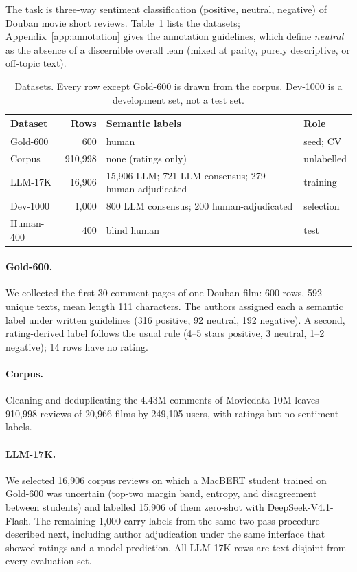 The task is three-way sentiment classification (positive, neutral,
negative) of Douban movie short reviews. Table~\ref{tab:datasets}
lists the datasets; Appendix~\ref{app:annotation} gives the annotation
guidelines, which define \emph{neutral} as the absence of a
discernible overall lean (mixed at parity, purely descriptive, or
off-topic text).

\begin{table}[t]
\centering
\small
\setlength{\tabcolsep}{3pt}
\begin{tabular}{@{}lrp{2.55cm}l@{}}
\toprule
Dataset & Rows & Semantic labels & Role \\
\midrule
Gold-600 & 600 & human & seed; CV \\
Corpus & 910{,}998 & none (ratings only) & unlabelled \\
LLM-17K & 16{,}906 & 15{,}906 LLM; 721 LLM consensus; 279 human-adjudicated & training \\
Dev-1000 & 1{,}000 & 800 LLM consensus; 200 human-adjudicated & selection \\
Human-400 & 400 & blind human & test \\
\bottomrule
\end{tabular}
\caption{Datasets. Every row except Gold-600 is drawn from the corpus.
Dev-1000 is a development set, not a test set.}
\label{tab:datasets}
\end{table}

\paragraph{Gold-600.} We collected the first 30 comment pages of one
Douban film: 600 rows, 592 unique texts, mean length 111 characters.
The authors assigned each a semantic label under written guidelines
(316 positive, 92 neutral, 192 negative). A second, rating-derived
label follows the usual rule (4--5 stars positive, 3 neutral, 1--2
negative); 14 rows have no rating.

\paragraph{Corpus.} Cleaning and deduplicating the 4.43M comments of
Moviedata-10M \citep{moviedata10m} leaves 910{,}998 reviews of
20{,}966 films by 249{,}105 users, with ratings but no sentiment
labels.

\paragraph{LLM-17K.} We selected 16{,}906 corpus reviews on which a
MacBERT student trained on Gold-600 was uncertain (top-two margin
band, entropy, and disagreement between students) and labelled
15{,}906 of them zero-shot with DeepSeek-V4.1-Flash. The remaining 1{,}000 carry labels from the same two-pass
procedure described next, including author adjudication under the
same interface that showed ratings and a model prediction. All
LLM-17K rows are text-disjoint from every evaluation set.

